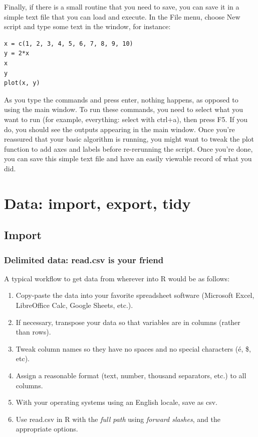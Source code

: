 \documentclass{report}
\newcommand{\code}[1]{\textsf{\ttfamily #1}}
\begin{document}
	Finally, if there is a small routine that you need to save, you can save it in a simple text file that you can load and execute. In the \code{File} menu, choose \code{New script} and type some text in the window, for instance:
	\begin{verbatim}
x = c(1, 2, 3, 4, 5, 6, 7, 8, 9, 10)
y = 2*x
x
y
plot(x, y)
	\end{verbatim}
	As you type the commands and press enter, nothing happens, as opposed to using the main window. To run these commands, you need to select what you want to run (for example, everything: select with ctrl+a), then press F5. If you do, you should see the outputs appearing in the main window. Once you're reassured that your basic algorithm is running, you might want to tweak the plot function to add axes and labels before re-rerunning the script. Once you're done, you can save this simple text file and have an easily viewable record of what you did.
	
	\section{Data: import, export, tidy}\label{sec:data-import}	
		\subsection{Import}\label{subsec:import}
		\subsubsection{Delimited data: \code{read.csv} is your friend}
		A typical workflow to get data from wherever into R would be as follows:
		\begin{enumerate}
			\item Copy-paste the data into your favorite spreadsheet software (Microsoft Excel, LibreOffice Calc, Google Sheets, etc.).
			\item If necessary, transpose your data so that variables are in columns (rather than rows).
			\item Tweak column names so they have no spaces and no special characters (é, \$, etc).
			\item Assign a reasonable format (text, number, thousand separators, etc.) to all columns.
			\item With your operating systems using an English locale, save as csv.
			\item Use \code{read.csv} in R with the \emph{full path} using \emph{forward slashes}, and the appropriate options.
		\end{enumerate}
	
\end{document}
